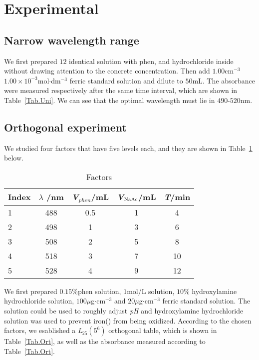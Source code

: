 \ifx\SUM\undefined


\fi

\section{Experimental}

\subsection{Narrow wavelength range}
We first prepared $12$ identical solution with phen,  and hydrochloride inside without drawing attention to the concrete concentration. Then add $1.00$cm$^{-3}$ $1.00\times10^{-3}$mol$\cdot$dm$^{-3}$ ferric standard solution and dilute to $50$mL. The absorbance were measured respectively after the same time interval, which are shown in Table~\ref{Tab.Uni}. We can see that the optimal wavelength must lie in $490$-$520$nm.

\subsection{Orthogonal experiment}
We studied four factors that have five levels each, and they are shown in Table~\ref{Tab.Fac} below.
\begin{table}[H]
	\caption{Factors}
	\label{Tab.Fac}
	\begin{tabular}{lcccc}
		\toprule
		Index & $\lambda$ /nm & \emph{V$_{phen}$}/mL & \emph{V$_{\ce{NaAc}}$}/mL & \emph{T}/min\\
		\midrule
		1     & 488           & 0.5                & 1                  & 4    \\
		2     & 498           & 1                  & 3                  & 6    \\
		3     & 508           & 2                  & 5                  & 8    \\
		4     & 518           & 3                  & 7                  & 10   \\
		5     & 528           & 4                  & 9                  & 12   \\
		\bottomrule
	\end{tabular}
\end{table}

We first prepared $0.15\%$phen solution, $1$mol/L  solution, $10\%$ hydroxylamine hydrochloride solution, $100\mu$g$\cdot$cm$^{-3}$ and $20\mu$g$\cdot$cm$^{-3}$ ferric standard solution. The  solution could be used to roughly adjust \emph{pH} and hydroxylamine hydrochloride solution was used to prevent iron(\uppercase\expandafter{}) from being oxidized. According to the chosen factors, we esablished a \emph{L$_{25}(5^6)$} orthogonal table, which is shown in Table~\ref{Tab.Ort}, as well as the absorbance measured according to Table~\ref{Tab.Ort}.

